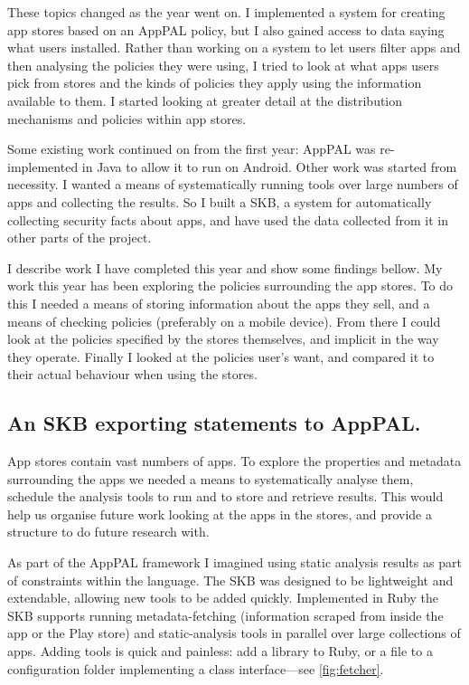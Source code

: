 \documentclass[a4paper]{scrartcl}
\begin{document}
These topics changed as the year went on.
I implemented a system for creating app stores based on an AppPAL policy, but I also gained access to data saying what users installed.
Rather than working on a system to let users filter apps and then analysing the policies they were using, I tried to look at what apps users pick from stores and the kinds of policies they apply using the information available to them.
I started looking at greater detail at the distribution mechanisms and policies within app stores.

Some existing work continued on from the first year: AppPAL was re-implemented in Java to allow it to run on Android.
Other work was started from necessity.
I wanted a means of systematically running tools over large numbers of apps and collecting the results.
So I built a \ac{SKB}, a system for automatically collecting security facts about apps, and have used the data collected from it in other parts of the project.

I describe work I have completed this year and show some findings bellow.
My work this year has been exploring the policies surrounding the app stores.
To do this I needed a means of storing information about the apps they sell, and a means of checking policies (preferably on a mobile device).
From there I could look at the policies specified by the stores themselves, and implicit in the way they operate.
Finally I looked at the policies user's want, and compared it to their actual behaviour when using the stores.

\subsection{An \ac{SKB} exporting statements to AppPAL.}

App stores contain vast numbers of apps.
To explore the properties and metadata surrounding the apps we needed a means to systematically analyse them, schedule the analysis tools to run and to store and retrieve results.
This would help us organise future work looking at the apps in the stores, and provide a structure to do future research with.

As part of the AppPAL framework I imagined using static analysis results as part of constraints within the language.
The \ac{SKB} was designed to be lightweight and extendable, allowing new tools to be added quickly.
Implemented in Ruby the \ac{SKB} supports running metadata-fetching (information scraped from inside the app or the Play store) and static-analysis tools in parallel over large collections of apps.
Adding tools is quick and painless: add a library to Ruby, or a file to a configuration folder implementing a class interface---see \autoref{fig:fetcher}.
\end{document}
